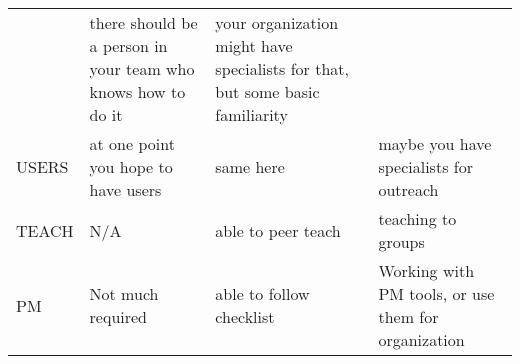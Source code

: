 \documentclass[a4paper
]{article}
\begin{document}
\begin{landscape}
\begin{longtable}[]{@{}llll@{}}
\begin{minipage}[t]{0.28\columnwidth}
\end{minipage} & \begin{minipage}[t]{0.28\columnwidth}\raggedright
there should be a person in your team who knows how to do it\strut
\end{minipage} & \begin{minipage}[t]{0.14\columnwidth}\raggedright
your organization might have specialists for that, but some basic
familiarity\strut
\end{minipage}\tabularnewline
\begin{minipage}[t]{0.19\columnwidth}\raggedright
USERS\strut
\end{minipage} & \begin{minipage}[t]{0.28\columnwidth}\raggedright
at one point you hope to have users\strut
\end{minipage} & \begin{minipage}[t]{0.28\columnwidth}\raggedright
same here\strut
\end{minipage} & \begin{minipage}[t]{0.14\columnwidth}\raggedright
maybe you have specialists for outreach\strut
\end{minipage}\tabularnewline
\begin{minipage}[t]{0.19\columnwidth}\raggedright
TEACH\strut
\end{minipage} & \begin{minipage}[t]{0.28\columnwidth}\raggedright
N/A\strut
\end{minipage} & \begin{minipage}[t]{0.28\columnwidth}\raggedright
able to peer teach\strut
\end{minipage} & \begin{minipage}[t]{0.14\columnwidth}\raggedright
teaching to groups\strut
\end{minipage}\tabularnewline
\begin{minipage}[t]{0.19\columnwidth}\raggedright
PM\strut
\end{minipage} & \begin{minipage}[t]{0.28\columnwidth}\raggedright
Not much required\strut
\end{minipage} & \begin{minipage}[t]{0.28\columnwidth}\raggedright
able to follow checklist\strut
\end{minipage} & \begin{minipage}[t]{0.14\columnwidth}\raggedright
Working with PM tools, or use them for organization\strut
\end{minipage}\tabularnewline

\end{longtable}
\end{landscape}
\end{document}
